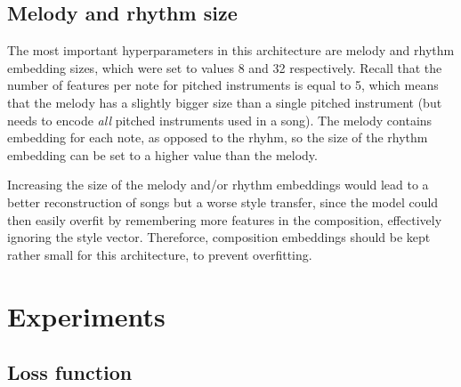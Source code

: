 \documentclass[en]{pracamgr}
\begin{document}
\section{Melody and rhythm size}

The most important hyperparameters in this architecture are melody and rhythm embedding sizes, which were set to values 8 and 32 respectively.
Recall that the number of features per note for pitched instruments is equal to 5, which means that
the melody has a slightly bigger size than a single pitched instrument (but needs to encode \emph{all} pitched instruments used in a song).
The melody contains embedding for each note, as opposed to the rhyhm, so the size of the rhythm embedding can be set to a higher value than the melody.

Increasing the size of the melody and/or rhythm embeddings would lead to a better reconstruction of songs but a worse style transfer, since the model could then easily overfit by remembering more features in the composition, effectively ignoring the style vector.
Thereforce, composition embeddings should be kept rather small for this architecture, to prevent overfitting.

\chapter{Experiments}

\section{Loss function}
\end{document}
